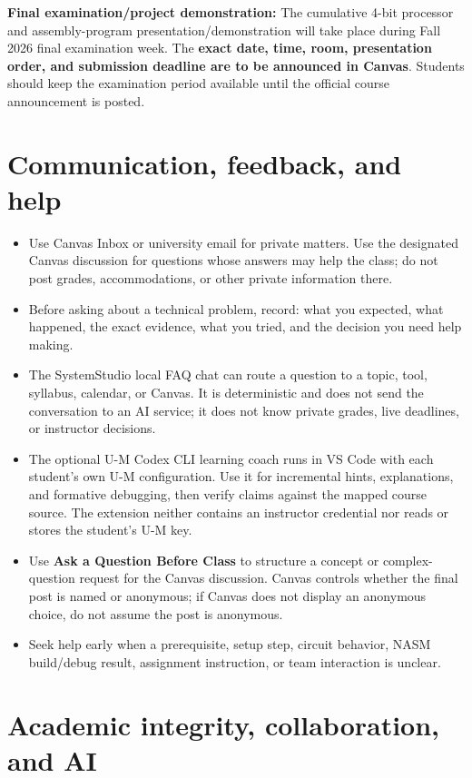 \documentclass[10pt,letterpaper]{article}
\begin{document}
\textbf{Final examination/project demonstration:} The cumulative 4-bit processor and assembly-program presentation/demonstration will take place during Fall 2026 final examination week. The \textbf{exact date, time, room, presentation order, and submission deadline are to be announced in Canvas}. Students should keep the examination period available until the official course announcement is posted.

\section{Communication, feedback, and help}

\begin{itemize}
  \item Use Canvas Inbox or university email for private matters. Use the designated Canvas discussion for questions whose answers may help the class; do not post grades, accommodations, or other private information there.
  \item Before asking about a technical problem, record: what you expected, what happened, the exact evidence, what you tried, and the decision you need help making.
  \item The SystemStudio local FAQ chat can route a question to a topic, tool, syllabus, calendar, or Canvas. It is deterministic and does not send the conversation to an AI service; it does not know private grades, live deadlines, or instructor decisions.
  \item The optional U-M Codex CLI learning coach runs in VS Code with each student's own U-M configuration. Use it for incremental hints, explanations, and formative debugging, then verify claims against the mapped course source. The extension neither contains an instructor credential nor reads or stores the student's U-M key.
  \item Use \textbf{Ask a Question Before Class} to structure a concept or complex-question request for the Canvas discussion. Canvas controls whether the final post is named or anonymous; if Canvas does not display an anonymous choice, do not assume the post is anonymous.
  \item Seek help early when a prerequisite, setup step, circuit behavior, NASM build/debug result, assignment instruction, or team interaction is unclear.
\end{itemize}

\section{Academic integrity, collaboration, and AI}
\end{document}
